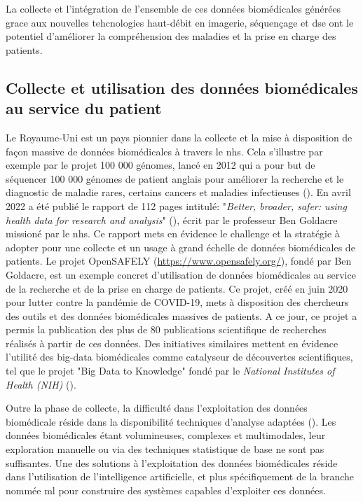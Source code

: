 La collecte et l'intégration de l'ensemble de ces données biomédicales générées grace aux nouvelles tehcnologies haut-débit en imagerie, séquençage et \gls{dse} ont le potentiel d'améliorer la compréhension des maladies et la prise en charge des patients.

\subsection{Collecte et utilisation des données biomédicales au service du patient}
Le Royaume-Uni est un pays pionnier dans la collecte et la mise à disposition de façon massive de données biomédicales à travers le \gls{nhs}. Cela s'illustre par exemple par le projet 100 000 génomes, lancé en 2012 qui a pour but de séquencer 100 000 génomes de patient anglais pour améliorer la recherche et le diagnostic de maladie rares, certains cancers et maladies infectieuses (\cite{nunn_public_2019}). En avril 2022 a été publié le rapport de 112 pages intitulé: "\textit{Better, broader, safer: using health data for research and analysis}" (\cite{ben_goldacre_better_2022}), écrit par le professeur Ben Goldacre missioné par le \gls{nhs}. Ce rapport mets en évidence le challenge et la stratégie à adopter pour une collecte et un usage à grand échelle de données biomédicales de patients. Le projet OpenSAFELY (\href{https://www.opensafely.org/}{https://www.opensafely.org/}), fondé par Ben Goldacre, est un exemple concret d'utilisation de données biomédicales au service de la recherche et de la prise en charge de patients. Ce projet, créé en juin 2020 pour lutter contre la pandémie de COVID-19, mets à disposition des chercheurs des outils et des données biomédicales massives de patients. A ce jour, ce projet a permis la publication des plus de 80 publications scientifique de recherches réalisés à partir de ces données. Des initiatives similaires  mettent en évidence l'utilité des big-data biomédicales comme catalyseur de découvertes scientifiques, tel que le projet "Big Data to Knowledge" fondé par le \textit{National Institutes of Health (NIH)} (\cite{toga_big_2015}).

Outre la phase de collecte, la difficulté dans l'exploitation des données biomédicale réside dans la disponibilité techniques d'analyse adaptées (\cite{wang_big_2019, ismail_requirements_2020}). Les données biomédicales étant volumineuses, complexes et multimodales, leur exploration manuelle ou via des techniques statistique de base ne sont pas suffisantes. Une des solutions à l'exploitation des données biomédicales réside dans l'utilisation de l'intelligence artificielle, et plus spécifiquement de la branche nommée \gls{ml} pour construire des systèmes capables d'exploiter ces données.

